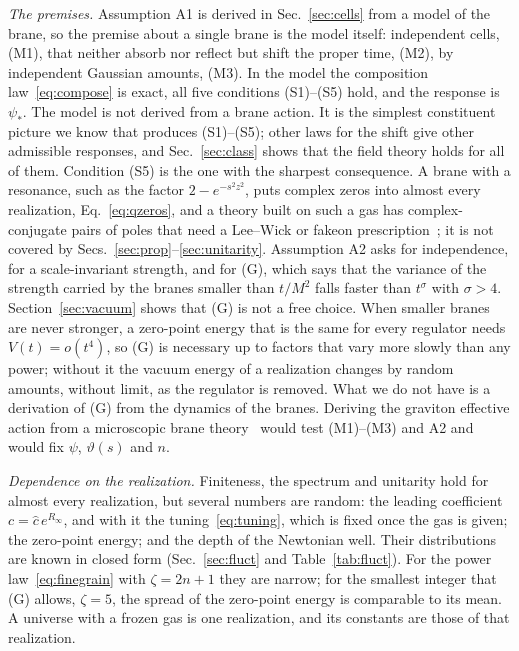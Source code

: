\documentclass[aps,prd,10pt,twocolumn,superscriptaddress,nofootinbib,floatfix,longbibliography]{revtex4-2}
\begin{document}
\textit{The premises.} Assumption A1 is derived in Sec.~\ref{sec:cells} from a model of the brane, so the premise about a single brane is the model itself: independent cells, (M1), that neither absorb nor reflect but shift the proper time, (M2), by independent Gaussian amounts, (M3). In the model the composition law~\eqref{eq:compose} is exact, all five conditions (S1)--(S5) hold, and the response is $\psi_*$. The model is not derived from a brane action. It is the simplest constituent picture we know that produces (S1)--(S5); other laws for the shift give other admissible responses, and Sec.~\ref{sec:class} shows that the field theory holds for all of them. Condition (S5) is the one with the sharpest consequence. A brane with a resonance, such as the factor $2-e^{-s^2z^2}$, puts complex zeros into almost every realization, Eq.~\eqref{eq:qzeros}, and a theory built on such a gas has complex-conjugate pairs of poles that need a Lee--Wick or fakeon prescription~\cite{LeeWick1969,Anselmi2017,AnselmiPiva2017}; it is not covered by Secs.~\ref{sec:prop}--\ref{sec:unitarity}. Assumption A2 asks for independence, for a scale-invariant strength, and for (G), which says that the variance of the strength carried by the branes smaller than $t/M^2$ falls faster than $t^{\sigma}$ with $\sigma>4$. Section~\ref{sec:vacuum} shows that (G) is not a free choice. When smaller branes are never stronger, a zero-point energy that is the same for every regulator needs $V(t)=o(t^4)$, so (G) is necessary up to factors that vary more slowly than any power; without it the vacuum energy of a realization changes by random amounts, without limit, as the regulator is removed. What we do not have is a derivation of (G) from the dynamics of the branes. Deriving the graviton effective action from a microscopic brane theory~\cite{Polchinski1995,Johnson2003} would test (M1)--(M3) and A2 and would fix $\psi$, $\vartheta(s)$ and $n$.

\textit{Dependence on the realization.} Finiteness, the spectrum and unitarity hold for almost every realization, but several numbers are random: the leading coefficient $c=\hat c\,e^{R_\infty}$, and with it the tuning~\eqref{eq:tuning}, which is fixed once the gas is given; the zero-point energy; and the depth of the Newtonian well. Their distributions are known in closed form (Sec.~\ref{sec:fluct} and Table~\ref{tab:fluct}). For the power law~\eqref{eq:finegrain} with $\zeta=2n+1$ they are narrow; for the smallest integer that (G) allows, $\zeta=5$, the spread of the zero-point energy is comparable to its mean. A universe with a frozen gas is one realization, and its constants are those of that realization.
\end{document}
